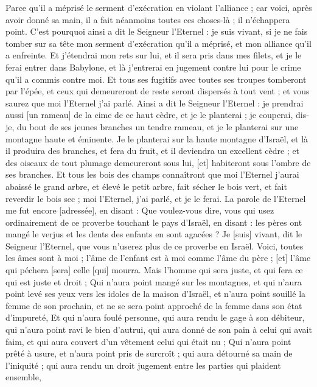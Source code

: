 \begin{multicols}{2}
Parce qu'il a méprisé le serment d'exécration en violant l'alliance ; car voici, après avoir donné sa main, il a fait néanmoins toutes ces choses-là ; il n'échappera point.
C'est pourquoi ainsi a dit le Seigneur l'Eternel : je suis vivant, si je ne fais tomber sur sa tête mon serment d'exécration qu'il a méprisé, et mon alliance qu'il a enfreinte.
Et j'étendrai mon rets sur lui, et il sera pris dans mes filets, et je le ferai entrer dans Babylone, et là j'entrerai en jugement contre lui pour le crime qu'il a commis contre moi.
Et tous ses fugitifs avec toutes ses troupes tomberont par l'épée, et ceux qui demeureront de reste seront dispersés à tout vent ; et vous saurez que moi l'Eternel j'ai parlé.
Ainsi a dit le Seigneur l'Eternel : je prendrai aussi [un rameau] de la cime de ce haut cèdre, et je le planterai ; je couperai, dis-je, du bout de ses jeunes branches un tendre rameau, et je le planterai sur une montagne haute et éminente.
Je le planterai sur la haute montagne d'Israël, et là il produira des branches, et fera du fruit, et il deviendra un excellent cèdre ; et des oiseaux de tout plumage demeureront sous lui, [et] habiteront sous l'ombre de ses branches.
Et tous les bois des champs connaîtront que moi l'Eternel j'aurai abaissé le grand arbre, et élevé le petit arbre, fait sécher le bois vert, et fait reverdir le bois sec ; moi l'Eternel, j'ai parlé, et je le ferai.
\VerseOne{}La parole de l'Eternel me fut encore [adressée], en disant :
Que voulez-vous dire, vous qui usez ordinairement de ce proverbe touchant le pays d'Israël, en disant : les pères ont mangé le verjus et les dents des enfants en sont agacées ?
Je [suis] vivant, dit le Seigneur l'Eternel, que vous n'userez plus de ce proverbe en Israël.
Voici, toutes les âmes sont à moi ; l'âme de l'enfant est à moi comme l'âme du père ; [et] l'âme qui péchera [sera] celle [qui] mourra.
Mais l'homme qui sera juste, et qui fera ce qui est juste et droit ;
Qui n'aura point mangé sur les montagnes, et qui n'aura point levé ses yeux vers les idoles de la maison d'Israël, et n'aura point souillé la femme de son prochain, et ne se sera point approché de la femme dans son état d'impureté,
Et qui n'aura foulé personne, qui aura rendu le gage à son débiteur, qui n'aura point ravi le bien d'autrui, qui aura donné de son pain à celui qui avait faim, et qui aura couvert d'un vêtement celui qui était nu ;
Qui n'aura point prêté à usure, et n'aura point pris de surcroît ; qui aura détourné sa main de l'iniquité ; qui aura rendu un droit jugement entre les parties qui plaident ensemble,

\end{multicols}
